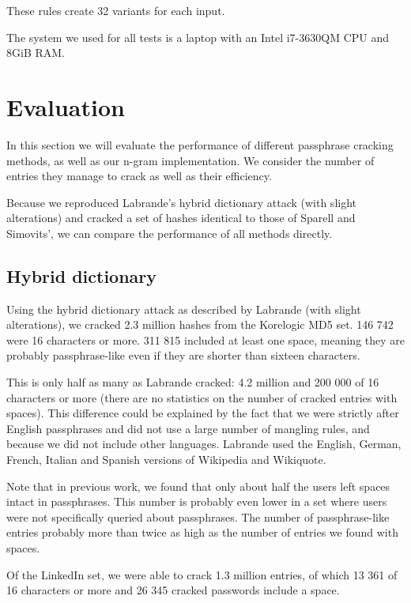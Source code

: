\documentclass{article}
\begin{document}
These rules create 32 variants for each input.

The system we used for all tests is a laptop with an Intel i7-3630QM CPU and
8GiB RAM.


\section{Evaluation}\label{sec:eval}

In this section we will evaluate the performance of different passphrase
cracking methods, as well as our n-gram implementation. We consider the number
of entries they manage to crack as well as their efficiency.

Because we reproduced Labrande's hybrid dictionary attack (with slight
alterations) and cracked a set of hashes identical to those of Sparell and
Simovits'\cite{sparell-simovits}, we can compare the performance of all methods
directly.


\subsection{Hybrid dictionary}\label{sub:dataset-results}

Using the hybrid dictionary attack as described by Labrande (with slight
alterations), we cracked 2.3 million hashes from the Korelogic MD5 set. 146 742
were 16 characters or more. 311 815 included at least one space, meaning they
are probably passphrase-like even if they are shorter than sixteen characters.

This is only half as many as Labrande cracked: 4.2 million and 200 000 of 16
characters or more (there are no statistics on the number of cracked entries
with spaces). This difference could be explained by the fact that we were
strictly after English passphrases and did not use a large number of mangling
rules, and because we did not include other languages. Labrande used the
English, German, French, Italian and Spanish versions of Wikipedia and
Wikiquote.

Note that in previous work\cite{own}, we found that only about half the users
left spaces intact in passphrases. This number is probably even lower in a set
where users were not specifically queried about passphrases. The number of
passphrase-like entries probably more than twice as high as the number of
entries we found with spaces.

Of the LinkedIn set, we were able to crack 1.3 million entries, of which 13 361
of 16 characters or more and 26 345 cracked passwords include a space.
\end{document}
